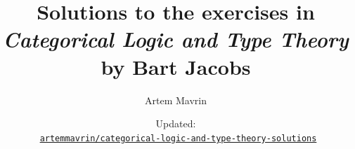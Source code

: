 \usepackage{defs}

\title{\texorpdfstring{%
Solutions to the exercises in\\
\emph{Categorical Logic and Type Theory}\\
by Bart Jacobs}%
{Categorical Logic and Type Theory Solutions}}
\author{Artem Mavrin}
\date{\small Updated: \texttt{\DTMNow}\\\faGithub\, \href{https://github.com/artemmavrin/categorical-logic-and-type-theory-solutions}{\texttt{artemmavrin/categorical-logic-and-type-theory-solutions}}}


